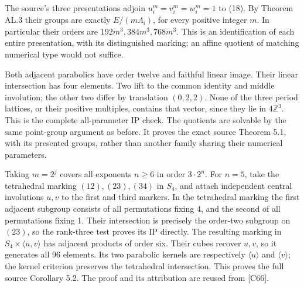The source's three presentations adjoin $u_i^m=v_i^m=w_i^m=1$ to (18). By Theorem AL.3 their groups are exactly $E/(m\Lambda_i)$, for every positive integer $m$. In particular their orders are $192m^3,384m^3,768m^3$. This is an identification of each entire presentation, with its distinguished marking; an affine quotient of matching numerical type would not suffice.

Both adjacent parabolics have order twelve and faithful linear image.
Their linear intersection has four elements. Two lift to the common
identity and middle involution; the other two differ by translation
\((0,2,2)\). None of the three period lattices, or their positive
multiples, contains that vector, since they lie in \(4\mathbb Z^3\).
This is the complete all-parameter IP check. The quotients are solvable
by the same point-group argument as before. It proves the exact
source Theorem 5.1, with its presented groups, rather than another
family sharing their numerical parameters.

Taking \(m=2^j\) covers all exponents \(n\geq6\) in order \(3\cdot2^n\).
For \(n=5\), take the tetrahedral marking
\((12),(23),(34)\) in \(S_4\), and attach independent central involutions
\(u,v\) to the first and third markers. In the tetrahedral marking the first adjacent subgroup consists of all permutations fixing 4, and the second of all permutations fixing 1. Their intersection is precisely the order-two subgroup on $(23)$, so the rank-three test proves its IP directly. The resulting marking in
\(S_4\times\langle u,v\rangle\) has adjacent products of order six.
Their cubes recover \(u,v\), so it generates all 96 elements. Its two
parabolic kernels are respectively \(\langle u\rangle\) and
\(\langle v\rangle\); the kernel criterion preserves the tetrahedral
intersection. This proves the full source Corollary 5.2. The proof and
its attribution are reused from {[}C66{]}.
